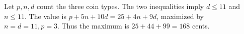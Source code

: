 Let $p,n,d$ count the three coin types. The two inequalities imply $d\le11$ and $n\le11$. The value is $p+5n+10d=25+4n+9d$, maximized by $n=d=11,p=3$. Thus the maximum is $25+44+99=\boxed{168}$ cents.

